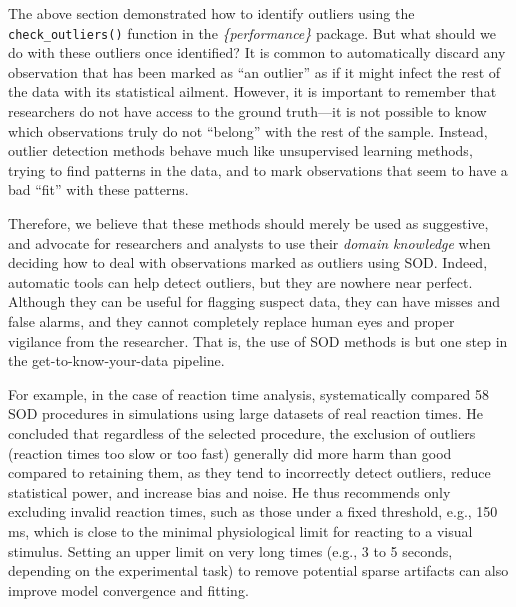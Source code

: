 \documentclass[sn-basic, lineno,pdflatex]{sn-jnl}
\begin{document}
The above section demonstrated how to identify outliers using the
\texttt{check\_outliers()} function in the \emph{\{performance\}}
package. But what should we do with these outliers once identified? It
is common to automatically discard any observation that has been marked
as ``an outlier'' as if it might infect the rest of the data with its
statistical ailment. However, it is important to remember that
researchers do not have access to the ground truth---it is not possible
to know which observations truly do not ``belong'' with the rest of the
sample. Instead, outlier detection methods behave much like unsupervised
learning methods, trying to find patterns in the data, and to mark
observations that seem to have a bad ``fit'' with these patterns.

Therefore, we believe that these methods should merely be used as
suggestive, and advocate for researchers and analysts to use their
\emph{domain knowledge} when deciding how to deal with observations
marked as outliers using SOD. Indeed, automatic tools can help detect
outliers, but they are nowhere near perfect. Although they can be useful
for flagging suspect data, they can have misses and false alarms, and
they cannot completely replace human eyes and proper vigilance from the
researcher. That is, the use of SOD methods is but one step in the
get-to-know-your-data pipeline.

For example, in the case of reaction time analysis,
\citet{miller2023outlier} systematically compared 58 SOD procedures in
simulations using large datasets of real reaction times. He concluded
that regardless of the selected procedure, the exclusion of outliers
(reaction times too slow or too fast) generally did more harm than good
compared to retaining them, as they tend to incorrectly detect outliers,
reduce statistical power, and increase bias and noise. He thus
recommends only excluding invalid reaction times, such as those under a
fixed threshold, e.g., 150 ms, which is close to the minimal
physiological limit for reacting to a visual stimulus. Setting an upper
limit on very long times (e.g., 3 to 5 seconds, depending on the
experimental task) to remove potential sparse artifacts can also improve
model convergence and fitting.
\end{document}
